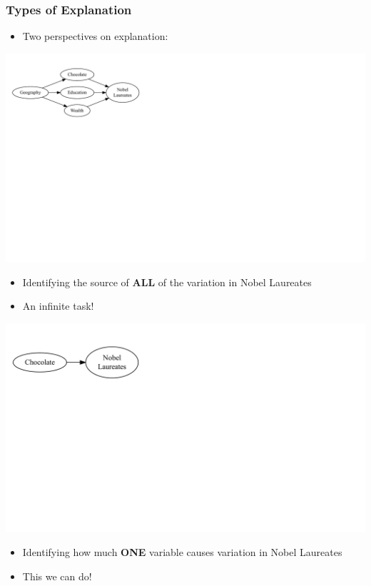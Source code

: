 \documentclass[xcolor=x11names,compress]{beamer}\usepackage[]{graphicx}\usepackage[]{color}
\makeatletter
\def\maxwidth{ %
  \ifdim\Gin@nat@width>\linewidth
    \linewidth
  \else
    \Gin@nat@width
  \fi
}
\newenvironment{knitrout}{}{} %
\renewcommand{\(}{\begin{columns}}
\renewcommand{\)}{\end{columns}}
\newcommand{\<}[1]{\begin{column}{#1}}
\renewcommand{\>}{\end{column}}
\makeatother
\begin{document}
\begin{frame}
\frametitle{Types of Explanation}
\begin{itemize}
\item Two perspectives on explanation:
\end{itemize}
\begin{multicols}{2}
\begin{knitrout}
\color{fgcolor}
\includegraphics[width=\maxwidth]{figure/explanation1-1} 

\end{knitrout}
\pause
\begin{itemize}
\item Identifying the source of \textbf{ALL} of the variation in Nobel Laureates
\pause
\item An infinite task!
\end{itemize}
\pause
\columnbreak
\begin{knitrout}
\color{fgcolor}
\includegraphics[width=\maxwidth]{figure/explanation2-1} 

\end{knitrout}
\pause
\begin{itemize}
\item Identifying how much \textbf{ONE} variable causes variation in Nobel Laureates
\pause
\item This we can do!
\end{itemize}
\end{multicols}
\end{frame}
\end{document}
